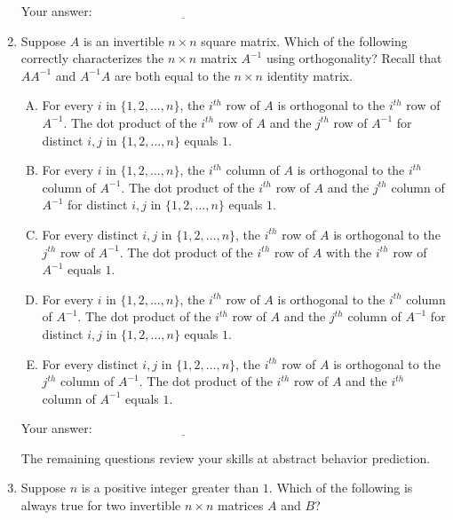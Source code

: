 \documentclass[10pt]{amsart}
\begin{document}
\begin{enumerate}
  \vspace{0.1in}
  Your answer: $\underline{\qquad\qquad\qquad\qquad\qquad\qquad\qquad}$
  \vspace{0.1in}

\item Suppose $A$ is an invertible $n \times n$ square matrix. Which
  of the following correctly characterizes the $n \times n$ matrix
  $A^{-1}$ using orthogonality? Recall that $AA^{-1}$ and $A^{-1}A$
  are both equal to the $n \times n$ identity matrix.

  \begin{enumerate}[(A)]
  \item For every $i$ in $\{ 1,2,\dots,n\}$, the $i^{th}$ row of $A$ is
    orthogonal to the $i^{th}$ row of $A^{-1}$. The dot product of the
    $i^{th}$ row of $A$ and the $j^{th}$ row of $A^{-1}$ for distinct
    $i,j$ in $\{1,2,\dots,n\}$ equals $1$.
  \item For every $i$ in $\{ 1,2,\dots,n\}$, the $i^{th}$ column of $A$ is
    orthogonal to the $i^{th}$ column of $A^{-1}$. The dot product of the
    $i^{th}$ row of $A$ and the $j^{th}$ column of $A^{-1}$ for distinct
    $i,j$ in $\{1,2,\dots,n\}$ equals $1$.
 \item For every distinct $i,j$ in $\{1,2,\dots,n\}$, the $i^{th}$ row
   of $A$ is orthogonal to the $j^{th}$ row of $A^{-1}$. The dot
   product of the $i^{th}$ row of $A$ with the $i^{th}$ row of
   $A^{-1}$ equals $1$.
   \item For every $i$ in $\{ 1,2,\dots,n\}$, the $i^{th}$ row of $A$ is
    orthogonal to the $i^{th}$ column of $A^{-1}$. The dot product of the
    $i^{th}$ row of $A$ and the $j^{th}$ column of $A^{-1}$ for distinct
    $i,j$ in $\{1,2,\dots,n\}$ equals $1$.
  \item For every distinct $i,j$ in $\{1,2,\dots,n\}$, the $i^{th}$
    row of $A$ is orthogonal to the $j^{th}$ column of $A^{-1}$. The
    dot product of the $i^{th}$ row of $A$ and the $i^{th}$ column of
    $A^{-1}$ equals $1$.
  \end{enumerate}

  \vspace{0.1in}
  Your answer: $\underline{\qquad\qquad\qquad\qquad\qquad\qquad\qquad}$
  \vspace{0.5in}

  The remaining questions review your skills at abstract behavior
  prediction.

\item Suppose $n$ is a positive integer greater than $1$. Which of the
  following is always true for two invertible $n \times n$ matrices
  $A$ and $B$?


\end{enumerate}
\end{document}
